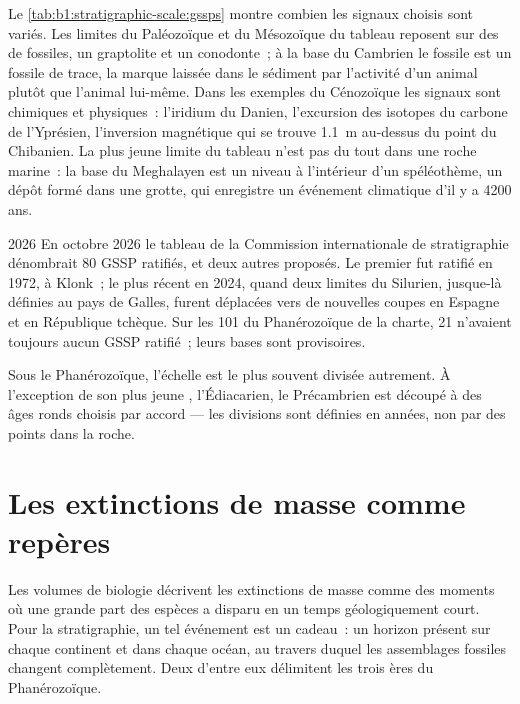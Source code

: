 Le \cref{tab:b1:stratigraphic-scale:gssps} montre combien les signaux choisis sont variés.
Les limites du Paléozoïque et du Mésozoïque du tableau reposent sur des  de
fossiles, un graptolite et un conodonte~; à la base du Cambrien le fossile est un
fossile de trace, la marque laissée dans le sédiment par l'activité d'un animal plutôt que
l'animal lui-même. Dans les exemples du Cénozoïque les signaux sont chimiques et
physiques~: l'iridium du Danien, l'excursion des isotopes du carbone de l'Yprésien,
l'inversion magnétique qui se trouve \qty{1.1}{m} au-dessus du point du Chibanien. La
plus jeune limite du tableau n'est pas du tout dans une roche marine~: la base du
Meghalayen est un niveau à l'intérieur d'un spéléothème, un dépôt formé dans une grotte, qui enregistre
un événement climatique d'il y a 4200 ans.

\begin{dated}{2026}
En octobre 2026 le tableau de la Commission internationale de stratigraphie dénombrait
80 GSSP ratifiés, et deux autres proposés. Le premier fut ratifié en 1972, à
Klonk~; le plus récent en 2024, quand deux limites du Silurien, jusque-là
définies au pays de Galles, furent déplacées vers de nouvelles coupes en Espagne et en
République tchèque. Sur les 101  du Phanérozoïque de la charte, 21 n'avaient toujours aucun
GSSP ratifié~; leurs bases sont provisoires.
\end{dated}

Sous le Phanérozoïque, l'échelle est le plus souvent divisée autrement. À l'exception de son
plus jeune , l'Édiacarien, le Précambrien est découpé à des âges ronds choisis par
accord --- les divisions sont définies en années, non par des points dans la roche.

\section{Les extinctions de masse comme repères}\label{sec:b1:stratigraphic-scale:extinctions}

Les volumes de biologie décrivent les extinctions de masse comme des moments où une grande part des
espèces a disparu en un temps géologiquement court. Pour la stratigraphie, un tel
événement est un cadeau~: un horizon présent sur chaque continent et dans chaque océan,
au travers duquel les assemblages fossiles changent complètement. Deux d'entre eux délimitent les
trois ères du Phanérozoïque.

